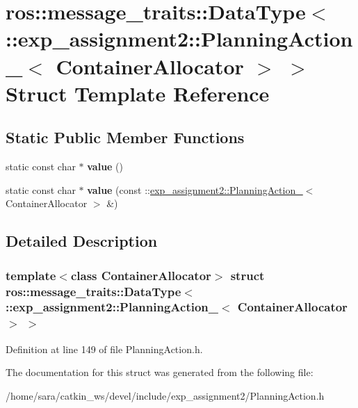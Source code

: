 \hypertarget{structros_1_1message__traits_1_1DataType_3_01_1_1exp__assignment2_1_1PlanningAction___3_01ContainerAllocator_01_4_01_4}{}\section{ros\+:\+:message\+\_\+traits\+:\+:Data\+Type$<$ \+:\+:exp\+\_\+assignment2\+:\+:Planning\+Action\+\_\+$<$ Container\+Allocator $>$ $>$ Struct Template Reference}
\label{structros_1_1message__traits_1_1DataType_3_01_1_1exp__assignment2_1_1PlanningAction___3_01ContainerAllocator_01_4_01_4}
\subsection*{Static Public Member Functions}
\begin{DoxyCompactItemize}
\item 
\mbox{\label{structros_1_1message__traits_1_1DataType_3_01_1_1exp__assignment2_1_1PlanningAction___3_01ContainerAllocator_01_4_01_4_ab4d58a253fd63ddfddf99e163d3b85f7}} 
static const char $\ast$ {\bfseries value} ()
\item 
\mbox{\label{structros_1_1message__traits_1_1DataType_3_01_1_1exp__assignment2_1_1PlanningAction___3_01ContainerAllocator_01_4_01_4_a3b0a93ee110237c026989f4594a873ac}} 
static const char $\ast$ {\bfseries value} (const \+::\hyperlink{structexp__assignment2_1_1PlanningAction__}{exp\+\_\+assignment2\+::\+Planning\+Action\+\_\+}$<$ Container\+Allocator $>$ \&)
\end{DoxyCompactItemize}


\subsection{Detailed Description}
\subsubsection*{template$<$class Container\+Allocator$>$\newline
struct ros\+::message\+\_\+traits\+::\+Data\+Type$<$ \+::exp\+\_\+assignment2\+::\+Planning\+Action\+\_\+$<$ Container\+Allocator $>$ $>$}



Definition at line 149 of file Planning\+Action.\+h.



The documentation for this struct was generated from the following file\+:\begin{DoxyCompactItemize}
\item 
/home/sara/catkin\+\_\+ws/devel/include/exp\+\_\+assignment2/Planning\+Action.\+h\end{DoxyCompactItemize}
